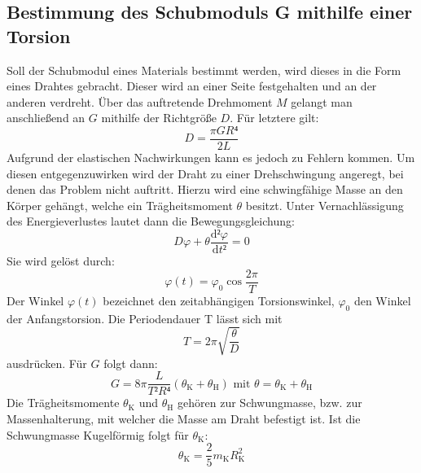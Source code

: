  \subsection{Bestimmung des Schubmoduls G mithilfe einer Torsion}
 Soll der Schubmodul eines Materials bestimmt werden, wird dieses in die Form eines Drahtes gebracht.
  Dieser wird an einer Seite festgehalten und an der anderen verdreht. Über das auftretende
   Drehmoment $M$ gelangt man anschließend an $G$ mithilfe der Richtgröße $D$. Für letztere gilt:
   \begin{equation}
     D = \frac{\pi GR⁴}{2L}
   \end{equation}
Aufgrund der elastischen Nachwirkungen kann es jedoch zu Fehlern kommen.
Um diesen entgegenzuwirken wird der Draht zu einer Drehschwingung angeregt, bei denen das Problem nicht auftritt.
 Hierzu wird eine schwingfähige Masse an den Körper gehängt, welche ein Trägheitsmoment $\theta$ besitzt.
Unter Vernachlässigung des Energieverlustes lautet dann die Bewegungsgleichung:
\begin{equation}
  D\varphi + \theta\frac{\text{d}²\varphi}{\text{d}t²} = 0
\end{equation}
Sie wird gelöst durch:
\begin{equation}
\varphi(t) = \varphi_0 \cos\frac{2\pi}{T}
\end{equation}
Der Winkel $\varphi(t)$ bezeichnet den zeitabhängigen Torsionswinkel,
 $\varphi_\text{0}$ den Winkel der Anfangstorsion. Die Periodendauer T lässt sich mit
\begin{equation}
  T = 2\pi\sqrt{\frac{\theta}{D}}
\end{equation}
ausdrücken. Für $G$ folgt dann:
\begin{equation}
  G = 8\pi \frac{L}{T²R⁴}(\theta_\text{K} + \theta_\text{H}) \text{ mit } \theta = \theta_\text{K} + \theta_\text{H}
\end{equation}
Die Trägheitsmomente $\theta_\text{K}$ und $\theta_\text{H}$ gehören zur Schwungmasse,
 bzw. zur Massenhalterung, mit welcher die Masse am Draht befestigt ist.
  Ist die Schwungmasse Kugelförmig folgt für $\theta_\text{K}$:
  \begin{equation}
    \theta_\text{K} = \frac{2}{5} m_\text{K} R_\text{K}^2
    \end{equation}

